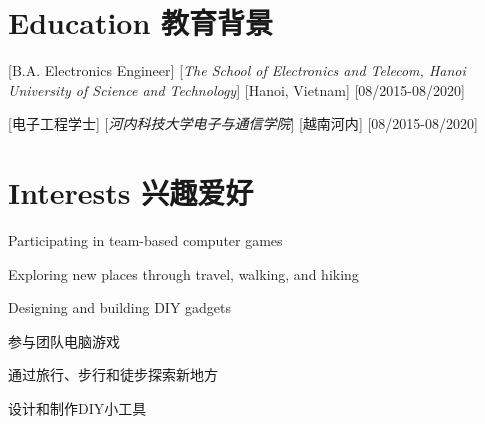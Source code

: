 \documentclass[
]
{article}
\providecommand{\tightlist}{%
  \setlength{\itemsep}{0pt}\setlength{\parskip}{0pt}}
\renewenvironment{itemize}{
  \begin{list}{}{
    \setlength{\leftmargin}{1.5em}
  }
}{
  \end{list}
}
\begin{document}
\section{Education \textbar{}
教育背景}\label{education-ux6559ux80b2ux80ccux666f}

{[}B.A. Electronics Engineer{]} {[}\emph{The School of Electronics and
Telecom, Hanoi University of Science and Technology}{]} {[}Hanoi,
Vietnam{]} {[}08/2015-08/2020{]}

\begin{figure*}

{[}电子工程学士{]} {[}\emph{河内科技大学电子与通信学院}{]}
{[}越南河内{]} {[}08/2015-08/2020{]}

\end{figure*}%

\section{Interests \textbar{}
兴趣爱好}\label{interests-ux5174ux8da3ux7231ux597d}

\begin{itemize}
\tightlist
\item
  Participating in team-based computer games
\item
  Exploring new places through travel, walking, and hiking
\item
  Designing and building DIY gadgets
\end{itemize}

\begin{figure*}

\begin{itemize}
\tightlist
\item
  参与团队电脑游戏
\item
  通过旅行、步行和徒步探索新地方
\item
  设计和制作DIY小工具
\end{itemize}

\end{figure*}%
\end{document}
